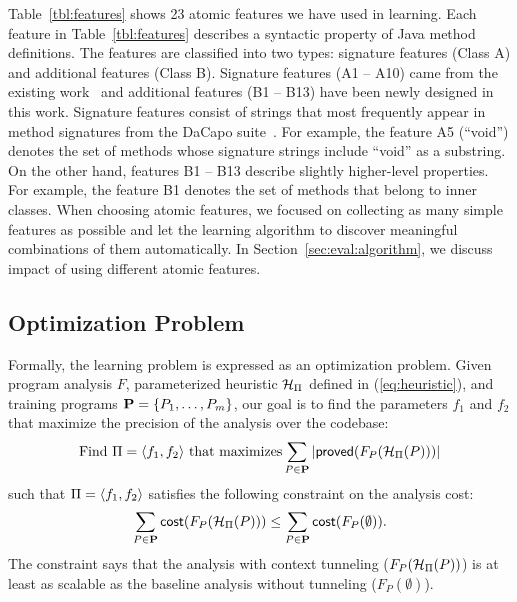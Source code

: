 \label{sec:features}

Table~\ref{tbl:features} shows 23 atomic features we have used in learning.
Each feature in Table~\ref{tbl:features} describes a syntactic
property of Java method definitions.  The features are classified into
two types: signature features (Class A) and additional
features (Class B).  Signature features (A1 -- A10) came from the existing work~\cite{JeJeChOh17} and
additional features (B1 -- B13) have been newly designed in this work.
Signature features consist of strings that most frequently appear in
method signatures from the DaCapo suite~\cite{Blackburn2006}. For example, the feature A5
(``void'') denotes the set of methods whose signature strings include
``void'' as a substring.  On the
other hand, features B1 -- B13 describe slightly higher-level
properties.  For example, the feature B1 denotes the set of methods
that belong to inner classes.
When choosing atomic features, we focused on collecting as many simple
features as possible and let the learning algorithm to discover
meaningful combinations of them automatically. In Section~\ref{sec:eval:algorithm}, we discuss impact of
using different atomic features.
%
%
%


\subsection{Optimization Problem}\label{sec:opt}
Formally, the learning problem is expressed as an optimization
problem.
Given program analysis $F$, parameterized heuristic
$\mathcal{H}_{\Pi}$ defined in (\ref{eq:heuristic}), and  training programs
$\mathbf{P} = \{ P_1,\dots,P_m \}$,
our goal is to find the parameters $f_1$ and $f_2$ that maximize the
precision of the analysis over the codebase:
\[
  \mbox{Find $\Pi = \langle f_1, f_2 \rangle$ that maximizes} \sum_{P \in \mathbf{P}}
  |{\sf proved}(F_{P}( \mathcal{H}_{\Pi}(P)))|
\]
such that $\Pi = \langle f_1,f_2 \rangle$ satisfies the following constraint on
the analysis cost:
\[
\sum_{P \in \mathbf{P}} {\sf cost}(F_P(\mathcal{H}_{\Pi}(P) )) \le \sum_{P \in \mathbf{P}} {\sf cost}(F_P(\emptyset)).
\]
The constraint says that the analysis with context tunneling ($F_P(\mathcal{H}_\Pi(P))$) is at
least as scalable as the baseline analysis
without tunneling ($F_P(\emptyset)$).



